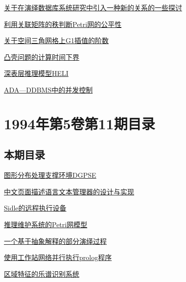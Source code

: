 \documentclass[a4paper]{article}
\begin{document}
\href{http://www.jos.org.cn/ch/reader/download_pdf.aspx?file_no=19941202&year_id=1994&quarter_id=12&falg=1}{关于在演绎数据库系统研究中引入一种新的关系的一些探讨}

\href{http://www.jos.org.cn/ch/reader/download_pdf.aspx?file_no=19941203&year_id=1994&quarter_id=12&falg=1}{利用关联矩阵的秩判断Petri网的公平性}

\href{http://www.jos.org.cn/ch/reader/download_pdf.aspx?file_no=19941204&year_id=1994&quarter_id=12&falg=1}{关于空间三角网格上G1插值的阶数}

\href{http://www.jos.org.cn/ch/reader/download_pdf.aspx?file_no=19941205&year_id=1994&quarter_id=12&falg=1}{凸壳问题的计算时间下界}

\href{http://www.jos.org.cn/ch/reader/download_pdf.aspx?file_no=19941206&year_id=1994&quarter_id=12&falg=1}{深表层推理模型HELI}

\href{http://www.jos.org.cn/ch/reader/download_pdf.aspx?file_no=19941207&year_id=1994&quarter_id=12&falg=1}{ADA—DDBMS中的并发控制}


\section{\textbf{1994年第5卷第11期目录}}
\subsection{本期目录}
\href{http://www.jos.org.cn/ch/reader/download_pdf.aspx?file_no=19941101&year_id=1994&quarter_id=11&falg=1}{图形分布处理支撑环境DGPSE}

\href{http://www.jos.org.cn/ch/reader/download_pdf.aspx?file_no=19941102&year_id=1994&quarter_id=11&falg=1}{中文页面描述语言文本管理器的设计与实现}

\href{http://www.jos.org.cn/ch/reader/download_pdf.aspx?file_no=19941103&year_id=1994&quarter_id=11&falg=1}{Sidle的远程执行设备}

\href{http://www.jos.org.cn/ch/reader/download_pdf.aspx?file_no=19941104&year_id=1994&quarter_id=11&falg=1}{推理维护系统的Petri网模型}

\href{http://www.jos.org.cn/ch/reader/download_pdf.aspx?file_no=19941105&year_id=1994&quarter_id=11&falg=1}{一个基于抽象解释的部分演绎过程}

\href{http://www.jos.org.cn/ch/reader/download_pdf.aspx?file_no=19941106&year_id=1994&quarter_id=11&falg=1}{使用工作站网络并行执行prolog程序}

\href{http://www.jos.org.cn/ch/reader/download_pdf.aspx?file_no=19941107&year_id=1994&quarter_id=11&falg=1}{区域特征的乐谱识别系统}
\end{document}
